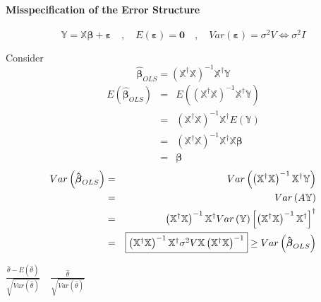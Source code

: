 \documentclass{article}
\begin{document}
\bigskip

\paragraph{Misspecification of the Error Structure}

\begin{equation*}
\mathbb{Y}=\mathbb{X}\boldsymbol{\beta }+\boldsymbol{\varepsilon }\quad
,\quad E\left( \boldsymbol{\varepsilon }\right) =\boldsymbol{0}\quad ,\quad
Var\left( \boldsymbol{\varepsilon }\right) =\sigma ^{2}V\Leftrightarrow
\sigma ^{2}I
\end{equation*}

Consider%
\begin{equation*}
\boldsymbol{\hat{\beta}}_{OLS}=\left( \mathbb{X}^{\dagger }\mathbb{X}\right)
^{-1}\mathbb{X}^{\dagger }\mathbb{Y}
\end{equation*}%
\begin{eqnarray*}
E\left( \boldsymbol{\hat{\beta}}_{OLS}\right) &=&E\left( \left( \mathbb{X}%
^{\dagger }\mathbb{X}\right) ^{-1}\mathbb{X}^{\dagger }\mathbb{Y}\right) \\
&=&\left( \mathbb{X}^{\dagger }\mathbb{X}\right) ^{-1}\mathbb{X}^{\dagger
}E\left( \mathbb{Y}\right) \\
&=&\left( \mathbb{X}^{\dagger }\mathbb{X}\right) ^{-1}\mathbb{X}^{\dagger }%
\mathbb{X}\boldsymbol{\beta } \\
&=&\boldsymbol{\beta }
\end{eqnarray*}%
\begin{eqnarray*}
Var\left( \boldsymbol{\hat{\beta}}_{OLS}\right) &=&Var\left( \left( \mathbb{X%
}^{\dagger }\mathbb{X}\right) ^{-1}\mathbb{X}^{\dagger }\mathbb{Y}\right) \\
&=&Var\left( A\mathbb{Y}\right) \\
&=&\left( \mathbb{X}^{\dagger }\mathbb{X}\right) ^{-1}\mathbb{X}^{\dagger
}Var\left( \mathbb{Y}\right) \left[ \left( \mathbb{X}^{\dagger }\mathbb{X}%
\right) ^{-1}\mathbb{X}^{\dagger }\right] ^{\dagger } \\
&=&\fbox{$\left( \mathbb{X}^{\dagger }\mathbb{X}\right) ^{-1}\mathbb{X}%
^{\dagger }\sigma ^{2}V\mathbb{X}\left( \mathbb{X}^{\dagger }\mathbb{X}%
\right) ^{-1}$}\geq Var\left( \boldsymbol{\hat{\beta}}_{OLS}\right)
\end{eqnarray*}

\bigskip

$\frac{\hat{\theta}-E\left( \hat{\theta}\right) }{\sqrt{Var\left( \hat{\theta%
}\right) }}\quad \frac{\hat{\theta}}{\sqrt{Var\left( \hat{\theta}\right) }}$
\end{document}
